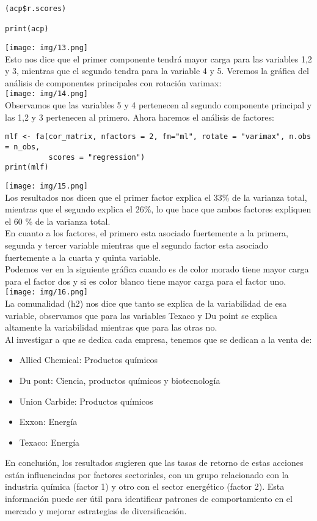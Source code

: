 \begin{sol}
\begin{verbatim}
(acp$r.scores)

print(acp)
\end{verbatim}
\texttt{[image: img/13.png]}\\
Esto nos dice que el primer componente tendrá mayor carga para las variables 1,2 y 3, mientras que el segundo tendra para la variable 4 y 5. Veremos la gráfica del análisis de componentes principales con rotación varimax:\\
\texttt{[image: img/14.png]}\\
Observamos que las variables 5 y 4 pertenecen al segundo componente principal y las 1,2 y 3 pertenecen al primero.
Ahora haremos el análisis de factores:
\begin{verbatim}
mlf <- fa(cor_matrix, nfactors = 2, fm="ml", rotate = "varimax", n.obs = n_obs,
          scores = "regression")
print(mlf)
\end{verbatim}
\texttt{[image: img/15.png]}\\
Los resultados nos dicen que el primer factor explica el 33\% de la varianza total, mientras que el segundo explica el 26\%, lo que hace que ambos factores expliquen el 60 \% de la varianza total.\\ En cuanto a los factores, el primero esta asociado fuertemente a la primera, segunda y tercer variable mientras que el segundo factor esta asociado fuertemente a la cuarta y quinta variable.\\ 
Podemos ver en la siguiente gráfica cuando es de color morado tiene mayor carga para el factor dos y si es color blanco tiene mayor carga para el factor uno.\\
\texttt{[image: img/16.png]}\\
La comunalidad (h2) nos dice que tanto se explica de la variabilidad de esa variable, observamos que para las variables Texaco y Du point se explica altamente la variabilidad mientras que para las otras no.\\
Al investigar a que se dedica cada empresa, tenemos que se dedican a la venta de:
\begin{itemize}
\item Allied Chemical: Productos químicos
\item Du pont: Ciencia, productos químicos y biotecnología
\item Union Carbide: Productos químicos
\item Exxon: Energía
\item Texaco: Energía
\end{itemize}
En conclusión, los resultados sugieren que las tasas de retorno de estas acciones están influenciadas por factores sectoriales, con un grupo relacionado con la industria química (factor 1) y otro con el sector energético (factor 2). Esta información puede ser útil para identificar patrones de comportamiento en el mercado y mejorar estrategias de diversificación.
\end{sol}